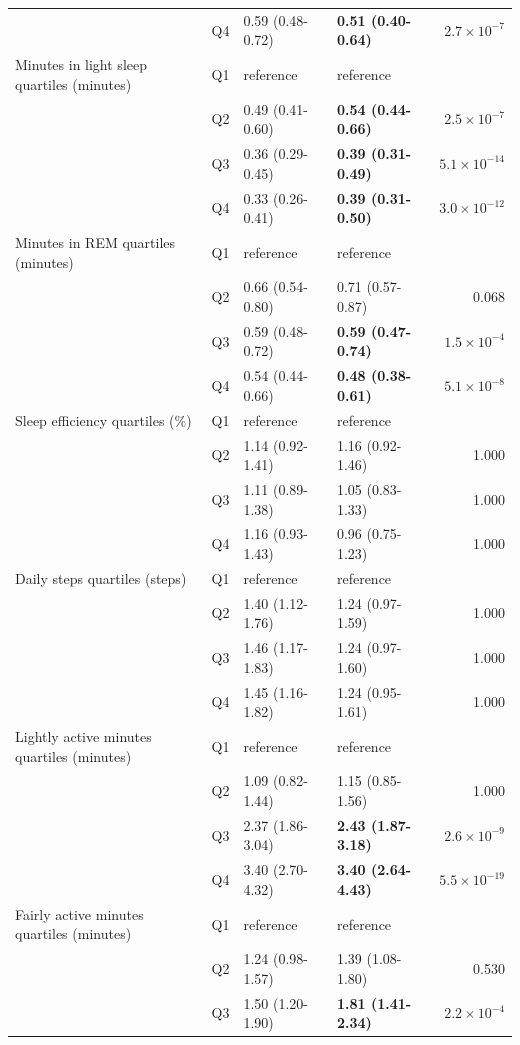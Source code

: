 \documentclass[11pt]{article}
\begin{document}
\begin{longtable}{@{}p{5.2cm}c p{3.0cm} p{3.0cm} r@{}}
 & Q4 & 0.59 (0.48-0.72) & \textbf{0.51 (0.40-0.64)} & $2.7\times10^{-7}$ \\
\addlinespace
Minutes in light sleep quartiles (minutes) & Q1 & reference & reference & \\
 & Q2 & 0.49 (0.41-0.60) & \textbf{0.54 (0.44-0.66)} & $2.5\times10^{-7}$ \\
 & Q3 & 0.36 (0.29-0.45) & \textbf{0.39 (0.31-0.49)} & $5.1\times10^{-14}$ \\
 & Q4 & 0.33 (0.26-0.41) & \textbf{0.39 (0.31-0.50)} & $3.0\times10^{-12}$ \\
\addlinespace
Minutes in REM quartiles (minutes) & Q1 & reference & reference & \\
 & Q2 & 0.66 (0.54-0.80) & 0.71 (0.57-0.87) & 0.068 \\
 & Q3 & 0.59 (0.48-0.72) & \textbf{0.59 (0.47-0.74)} & $1.5\times10^{-4}$ \\
 & Q4 & 0.54 (0.44-0.66) & \textbf{0.48 (0.38-0.61)} & $5.1\times10^{-8}$ \\
\addlinespace
Sleep efficiency quartiles (\%) & Q1 & reference & reference & \\
 & Q2 & 1.14 (0.92-1.41) & 1.16 (0.92-1.46) & 1.000 \\
 & Q3 & 1.11 (0.89-1.38) & 1.05 (0.83-1.33) & 1.000 \\
 & Q4 & 1.16 (0.93-1.43) & 0.96 (0.75-1.23) & 1.000 \\
\addlinespace
Daily steps quartiles (steps) & Q1 & reference & reference & \\
 & Q2 & 1.40 (1.12-1.76) & 1.24 (0.97-1.59) & 1.000 \\
 & Q3 & 1.46 (1.17-1.83) & 1.24 (0.97-1.60) & 1.000 \\
 & Q4 & 1.45 (1.16-1.82) & 1.24 (0.95-1.61) & 1.000 \\
\addlinespace
Lightly active minutes quartiles (minutes) & Q1 & reference & reference & \\
 & Q2 & 1.09 (0.82-1.44) & 1.15 (0.85-1.56) & 1.000 \\
 & Q3 & 2.37 (1.86-3.04) & \textbf{2.43 (1.87-3.18)} & $2.6\times10^{-9}$ \\
 & Q4 & 3.40 (2.70-4.32) & \textbf{3.40 (2.64-4.43)} & $5.5\times10^{-19}$ \\
\addlinespace
Fairly active minutes quartiles (minutes) & Q1 & reference & reference & \\
 & Q2 & 1.24 (0.98-1.57) & 1.39 (1.08-1.80) & 0.530 \\
 & Q3 & 1.50 (1.20-1.90) & \textbf{1.81 (1.41-2.34)} & $2.2\times10^{-4}$ \\

\end{longtable}
\end{document}
